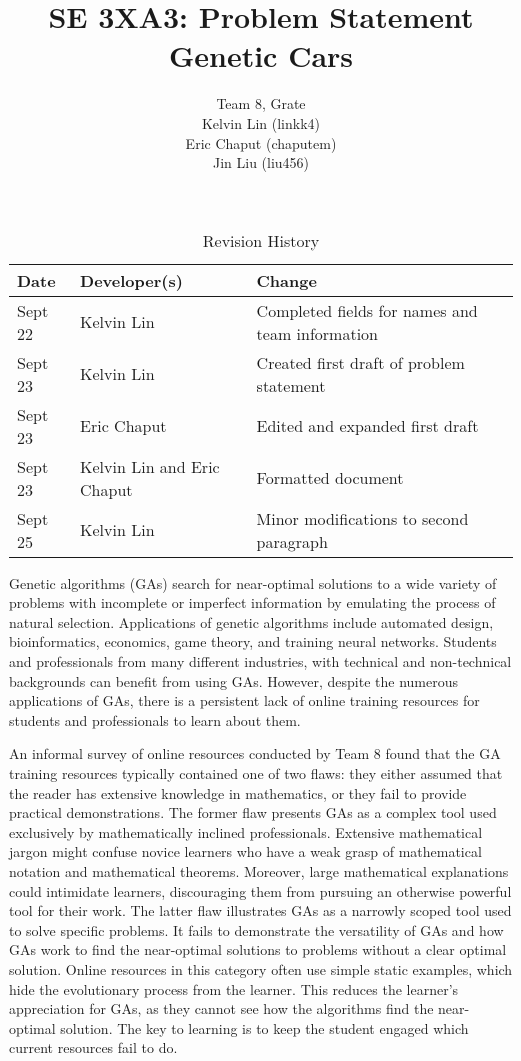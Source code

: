 \documentclass{article}
\title{SE 3XA3: Problem Statement\\Genetic Cars}
\author{Team 8, Grate
		\\ Kelvin Lin (linkk4)
		\\ Eric Chaput (chaputem)
		\\ Jin Liu (liu456)
}
\date{}
\begin{document}
\begin{table}[hp]
\color{blue}
\caption{Revision History} \label{TblRevisionHistory}
\begin{tabularx}{\textwidth}{llX}
\toprule
\textbf{Date} & \textbf{Developer(s)} & \textbf{Change}\\
\midrule
Sept 22 & Kelvin Lin & Completed fields for names and team information\\
Sept 23 & Kelvin Lin & Created first draft of problem statement\\
Sept 23 & Eric Chaput & Edited and expanded first draft\\
Sept 23 & Kelvin Lin and Eric Chaput& Formatted document\\
Sept 25 & Kelvin Lin & Minor modifications to second paragraph\\
\bottomrule
\end{tabularx}
\end{table}

\newpage
\color{black}
\maketitle

Genetic algorithms (GAs) search for near-optimal solutions to a wide variety of problems with incomplete or imperfect information by emulating the process of natural selection. Applications of genetic algorithms include automated design, bioinformatics, economics, game theory, and training neural networks. Students and professionals from many different industries, with technical and non-technical backgrounds can benefit from using GAs. However, despite the numerous applications of GAs, there is a persistent lack of online training resources for students and professionals to learn about them. 

An informal survey of online resources conducted by Team 8 found that the GA training resources typically contained one of two flaws: they either assumed that the reader has extensive knowledge in mathematics, or they fail to provide practical demonstrations. The former flaw presents GAs as a complex tool used exclusively by mathematically inclined professionals. Extensive mathematical jargon might confuse novice learners who have a weak grasp of mathematical notation and mathematical theorems. Moreover, large mathematical explanations could intimidate learners, discouraging them from pursuing an otherwise powerful tool for their work. The latter flaw illustrates GAs as a narrowly scoped tool used to solve specific problems. It fails to demonstrate the versatility of GAs and how GAs work to find the near-optimal solutions to problems without a clear optimal solution. Online resources in this category often use simple static examples, which hide the evolutionary process from the learner. This reduces the learner's appreciation for GAs, as they cannot see how the algorithms find the near-optimal solution. The key to learning is to keep the student engaged which current resources fail to do.
\end{document}
